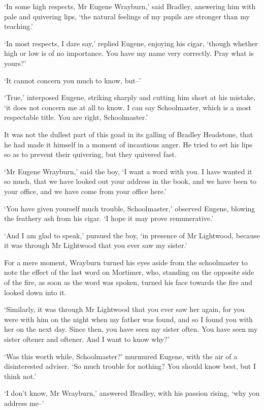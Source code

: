 ‘In some high respects, Mr Eugene Wrayburn,’ said Bradley, answering
him with pale and quivering lips, ‘the natural feelings of my pupils are
stronger than my teaching.’

‘In most respects, I dare say,’ replied Eugene, enjoying his cigar,
‘though whether high or low is of no importance. You have my name very
correctly. Pray what is yours?’

‘It cannot concern you much to know, but--’

‘True,’ interposed Eugene, striking sharply and cutting him short at his
mistake, ‘it does not concern me at all to know. I can say Schoolmaster,
which is a most respectable title. You are right, Schoolmaster.’

It was not the dullest part of this goad in its galling of Bradley
Headstone, that he had made it himself in a moment of incautious anger.
He tried to set his lips so as to prevent their quivering, but they
quivered fast.

‘Mr Eugene Wrayburn,’ said the boy, ‘I want a word with you. I have
wanted it so much, that we have looked out your address in the book, and
we have been to your office, and we have come from your office here.’

‘You have given yourself much trouble, Schoolmaster,’ observed
Eugene, blowing the feathery ash from his cigar. ‘I hope it may prove
remunerative.’

‘And I am glad to speak,’ pursued the boy, ‘in presence of Mr Lightwood,
because it was through Mr Lightwood that you ever saw my sister.’

For a mere moment, Wrayburn turned his eyes aside from the schoolmaster
to note the effect of the last word on Mortimer, who, standing on the
opposite side of the fire, as soon as the word was spoken, turned his
face towards the fire and looked down into it.

‘Similarly, it was through Mr Lightwood that you ever saw her again, for
you were with him on the night when my father was found, and so I found
you with her on the next day. Since then, you have seen my sister often.
You have seen my sister oftener and oftener. And I want to know why?’

‘Was this worth while, Schoolmaster?’ murmured Eugene, with the air of
a disinterested adviser. ‘So much trouble for nothing? You should know
best, but I think not.’

‘I don’t know, Mr Wrayburn,’ answered Bradley, with his passion rising,
‘why you address me--’

